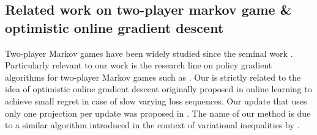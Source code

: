 \subsection{Related work on two-player markov game \& optimistic online gradient descent}
Two-player Markov games have been widely studied since the seminal work \citep{shapley1953stochastic}. Particularly relevant to our work is the research line on policy gradient algorithms for two-player Markov games such as \citet{daskalakis2020independent,wei2021last,alacaoglu2022natural}.
Our \oomdmethod{} is strictly related to the idea of optimistic online gradient descent \citep{popov1980modification,chiang2012online,rakhlin2013online} originally proposed in online learning to achieve small regret in case of slow varying loss sequences. Our update that uses only one projection per update was proposed in \citet{joulani17a}. The name of our method is due to a similar algorithm introduced in the context of variational inequalities by \citet{malitsky2020forward}.
